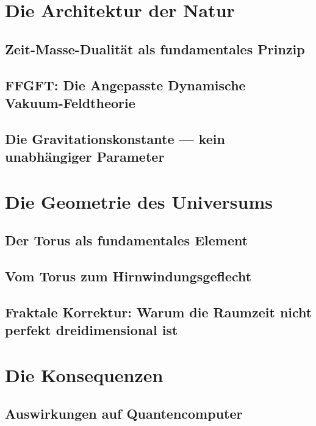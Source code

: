 \documentclass[11pt,twoside,openright]{book}
\begin{document}
\part{Die Architektur der Natur}

\chapter{Zeit-Masse-Dualität als fundamentales Prinzip}


\chapter[FFGFT: Dynamische Vakuum-Feldtheorie]{FFGFT: Die Angepasste Dynamische\\Vakuum-Feldtheorie}


\chapter{Die Gravitationskonstante --- kein unabhängiger Parameter}


\part{Die Geometrie des Universums}

\chapter{Der Torus als fundamentales Element}


\chapter{Vom Torus zum Hirnwindungsgeflecht}


\chapter{Fraktale Korrektur: Warum die Raumzeit nicht perfekt dreidimensional ist}


\part{Die Konsequenzen}

\chapter{Auswirkungen auf Quantencomputer}

\end{document}
